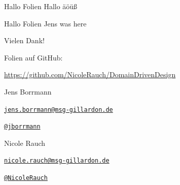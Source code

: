 \begin{frame}{Hallo Folien}
Hallo äöüß
\end{frame}
\begin{frame}{Hallo Folien}
Jens was here
\end{frame}


{
\begin{frame}{Vielen Dank!}

        Folien auf GitHub:
        \vspace{-0.8em}
        \begin{center}
                \url{https://github.com/NicoleRauch/DomainDrivenDesign}
        \end{center}

        \begin{block}{Jens Borrmann}
        \begin{description}[Twitterxx]
                \item[E-Mail]  \href{mailto:jens.borrmann@msg-gillardon.de}{\texttt{jens.borrmann@msg-gillardon.de}}
                \item[Twitter] \href{http://twitter.com/jborrmann}{\texttt{@jborrmann}}
        \end{description}
        \end{block}
        \begin{block}{Nicole Rauch}
        \begin{description}[Twitterxx]
                \item[E-Mail]  \href{mailto:nicole.rauch@msg-gillardon.de}{\texttt{nicole.rauch@msg-gillardon.de}}
                \item[Twitter] \href{http://twitter.com/NicoleRauch}{\texttt{@NicoleRauch}}
        \end{description}
        \end{block}
\end{frame}
}
